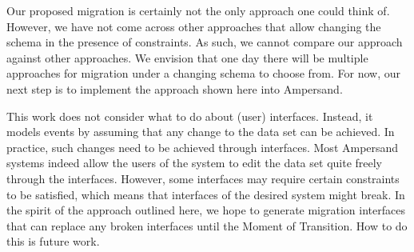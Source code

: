 \documentclass[runningheads]{llncs}
\begin{document}
   Our proposed migration is certainly not the only approach one could think of.
   However, we have not come across other approaches that allow changing the schema in the presence of constraints.
   As such, we cannot compare our approach against other approaches.
   We envision that one day there will be multiple approaches for migration under a changing schema to choose from.
   For now, our next step is to implement the approach shown here into Ampersand.

   This work does not consider what to do about (user) interfaces.
   Instead, it models events by assuming that any change to the data set can be achieved.
   In practice, such changes need to be achieved through interfaces.
   Most Ampersand systems indeed allow the users of the system to edit the data set quite freely through the interfaces.
   However, some interfaces may require certain constraints to be satisfied, which means that interfaces of the desired system might break.
   In the spirit of the approach outlined here, we hope to generate migration interfaces that can replace any broken interfaces until the Moment of Transition.
   How to do this is future work.



\end{document}
